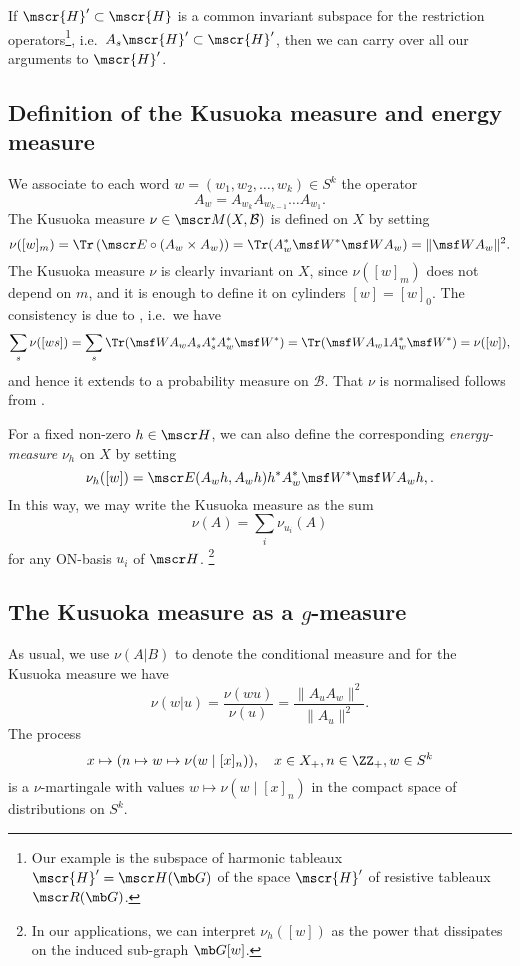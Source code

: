 \documentclass[11pt]{scrartcl}
\def\X{X}
\renewcommand{\T}{^*}
\renewcommand{\H}{\mscr{H}}
\theoremstyle{plain} %
\theoremstyle{definition}
\begin{document}
If $\H'\subset\H$ is a common invariant subspace for the restriction
operators\footnote{%
Our example is the subspace of harmonic tableaux $\H'=\mscr H(\mb G)$
of the space $\H'$ of resistive tableaux $\mscr R(\mb G)$.}, i.e.\ $A_s\H' \subset \H'$, then we can carry over all our
arguments to $\H'$. 

\subsection{Definition of the Kusuoka measure and energy measure}
We associate to each word $w=(w_1,w_2,\dots,w_k)\in S^k$ the operator 
$$ A_w=A_{w_k} A_{w_{k-1}}\dots A_{w_1}. $$
The Kusuoka measure $\nu\in\mscr M(\X,\mathcal B)$ is defined on $\X$ by setting 
\begin{equation}
  \label{kusuokadef1}
\nu([w]_m) = 
\Tr\left(\mscr E\circ (A_w\times A_w)\right) = 
\Tr(A_w^*\W^* \W A_w) = \| \W A_w \|^2.
\end{equation}
The Kusuoka measure $\nu$
is clearly invariant on $\X$, since $\nu([w]_m)$ does not depend
on $m$, and it is enough to define it on cylinders $[w]=[w]_0$. 
The consistency is due to , i.e.\ we have 
$$ 
\sum_s \nu([ws]) = \sum_s \Tr(\W A_w A_s A_s^* A_w^* \W^*) = 
  \Tr(\W A_w 1 A_w^* \W^*) = \nu([w]), 
$$
and hence it extends to a probability measure on $\mathcal B$.
That $\nu$ is normalised follows from . 

For a fixed non-zero $h\in\mscr H$, we can also define the corresponding 
\emph{energy-measure }
$\nu_h$ on $\X$ by setting 
$$ \nu_h([w]) = \mscr E(A_w h, A_w h) h\T A_w\T \W\T \W A_w h, . $$
In this way, we may write the Kusuoka measure as the sum 
$$ \nu(A) = \sum_i \nu_{u_i}(A) $$
for any ON-basis $u_i$ of $\mscr H$. 
\footnote{In our applications, we can interpret $\nu_h([w])$ as 
the power that dissipates on the induced sub-graph $\mb G[w]$.}

\subsection{The Kusuoka measure as a $g$-measure}

As usual, we use $\nu(A|B)$ to denote the conditional measure and for
the Kusuoka measure we have 
$$ \nu(w|u)=\frac{\nu(wu)}{\nu(u)} = \frac{\|A_u A_w\|^2}{\| A_u \|^2}. $$
The process
$$ x\mapsto (n\mapsto w \mapsto \nu(w\mid [x]_n)), 
\quad x\in\X_+, n\in\ZZ_+, w\in S^k $$ is a $\nu$-martingale with
values $w\mapsto \nu(w \mid [x]_n)$ in the compact space of
distributions on $S^k$. 
\end{document}
